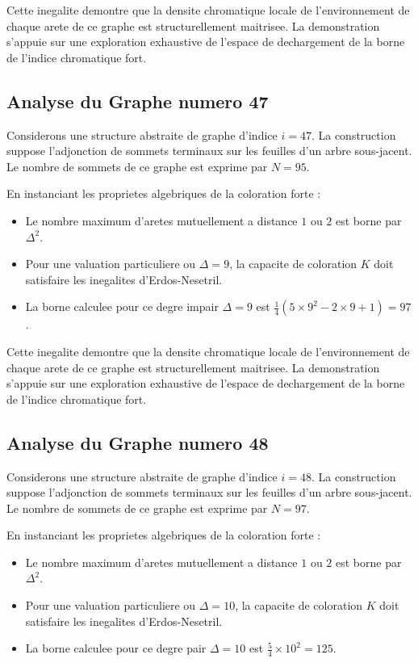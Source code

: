 \documentclass[11pt,a4paper]{article}
\begin{document}
Cette inegalite demontre que la densite chromatique locale de l'environnement de chaque arete de ce graphe est structurellement maitrisee. La demonstration s'appuie sur une exploration exhaustive de l'espace de dechargement de la borne de l'indice chromatique fort.

\subsection{Analyse du Graphe numero 47}
Considerons une structure abstraite de graphe d'indice $i = 47$. La construction suppose l'adjonction de sommets terminaux sur les feuilles d'un arbre sous-jacent. Le nombre de sommets de ce graphe est exprime par $N = 95$.

En instanciant les proprietes algebriques de la coloration forte :
\begin{itemize}
\item Le nombre maximum d'aretes mutuellement a distance $1$ ou $2$ est borne par $\Delta^2$.
\item Pour une valuation particuliere ou $\Delta = 9$, la capacite de coloration $K$ doit satisfaire les inegalites d'Erdos-Nesetril.
\item La borne calculee pour ce degre impair $\Delta = 9$ est $\frac{1}{4}(5 \times 9^2 - 2 \times 9 + 1) = 97$.
\end{itemize}

Cette inegalite demontre que la densite chromatique locale de l'environnement de chaque arete de ce graphe est structurellement maitrisee. La demonstration s'appuie sur une exploration exhaustive de l'espace de dechargement de la borne de l'indice chromatique fort.

\subsection{Analyse du Graphe numero 48}
Considerons une structure abstraite de graphe d'indice $i = 48$. La construction suppose l'adjonction de sommets terminaux sur les feuilles d'un arbre sous-jacent. Le nombre de sommets de ce graphe est exprime par $N = 97$.

En instanciant les proprietes algebriques de la coloration forte :
\begin{itemize}
\item Le nombre maximum d'aretes mutuellement a distance $1$ ou $2$ est borne par $\Delta^2$.
\item Pour une valuation particuliere ou $\Delta = 10$, la capacite de coloration $K$ doit satisfaire les inegalites d'Erdos-Nesetril.
\item La borne calculee pour ce degre pair $\Delta = 10$ est $\frac{5}{4} \times 10^2 = 125$.
\end{itemize}
\end{document}
